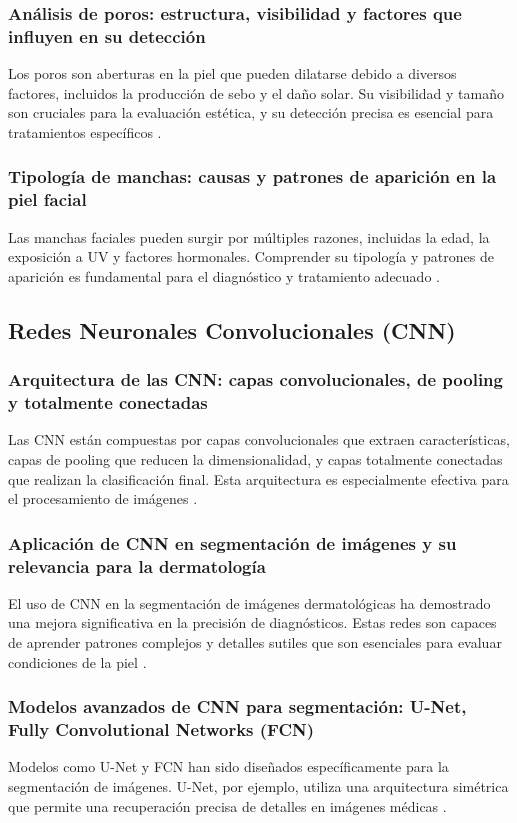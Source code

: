 \subsubsection{Análisis de poros: estructura, visibilidad y factores que influyen en su detección}
Los poros son aberturas en la piel que pueden dilatarse debido a diversos factores, incluidos la producción de sebo y el daño solar. Su visibilidad y tamaño son cruciales para la evaluación estética, y su detección precisa es esencial para tratamientos específicos \cite{cameron2021}.

\subsubsection{Tipología de manchas: causas y patrones de aparición en la piel facial}
Las manchas faciales pueden surgir por múltiples razones, incluidas la edad, la exposición a UV y factores hormonales. Comprender su tipología y patrones de aparición es fundamental para el diagnóstico y tratamiento adecuado \cite{zouboulis2014}.

\subsection{Redes Neuronales Convolucionales (CNN)}

\subsubsection{Arquitectura de las CNN: capas convolucionales, de pooling y totalmente conectadas}
Las CNN están compuestas por capas convolucionales que extraen características, capas de pooling que reducen la dimensionalidad, y capas totalmente conectadas que realizan la clasificación final. Esta arquitectura es especialmente efectiva para el procesamiento de imágenes \cite{krizhevsky2012}.

\subsubsection{Aplicación de CNN en segmentación de imágenes y su relevancia para la dermatología}
El uso de CNN en la segmentación de imágenes dermatológicas ha demostrado una mejora significativa en la precisión de diagnósticos. Estas redes son capaces de aprender patrones complejos y detalles sutiles que son esenciales para evaluar condiciones de la piel \cite{esteva2017}.

\subsubsection{Modelos avanzados de CNN para segmentación: U-Net, Fully Convolutional Networks (FCN)}
Modelos como U-Net y FCN han sido diseñados específicamente para la segmentación de imágenes. U-Net, por ejemplo, utiliza una arquitectura simétrica que permite una recuperación precisa de detalles en imágenes médicas \cite{ronneberger2015}.

